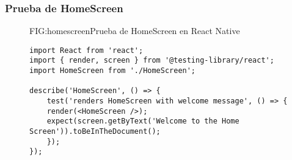 \newpage

\subsubsection{Prueba de HomeScreen}
\begin{figure}[Prueba de HomeScreen]{FIG:homescreen}{Prueba de HomeScreen en React Native}
    \begin{verbatim}
import React from 'react';
import { render, screen } from '@testing-library/react';
import HomeScreen from './HomeScreen';

describe('HomeScreen', () => {
    test('renders HomeScreen with welcome message', () => {
    render(<HomeScreen />);
    expect(screen.getByText('Welcome to the Home Screen')).toBeInTheDocument();
    });
});
    \end{verbatim}
    \end{figure}

\newpage
